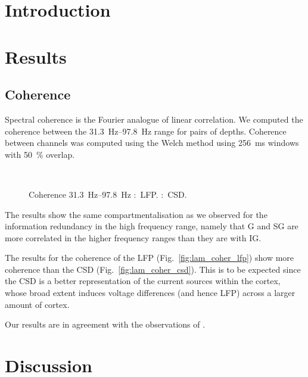 \section{Introduction}

\section{Results}

\subsection{Coherence}

Spectral coherence is the Fourier analogue of linear correlation.
We computed the coherence between the \SIrange{31.3}{97.8}{Hz} range for pairs of depths.
Coherence between channels was computed using the Welch method using \SI{256}{\milli\second} windows with \SI{50}{\percent} overlap.


\begin{figure}[htb]
    \centering
    ~~
    \caption{Coherence \SIrange{31.3}{97.8}{Hz}
\protect{}:~\ac{LFP}.
\protect{}:~\ac{CSD}.
}
\label{fig:lam_coher}
\end{figure}

The results show the same compartmentalisation as we observed for the information redundancy in the high frequency range, namely that \ac{G} and \ac{SG} are more correlated in the higher frequency ranges than they are with \ac{IG}.

The results for the coherence of the \ac{LFP} (Fig.~\ref{fig:lam_coher_lfp}) show more coherence than the \ac{CSD} (Fig.~\ref{fig:lam_coher_csd}).
This is to be expected since the \ac{CSD} is a better representation of the current sources within the cortex, whose broad extent induces voltage differences (and hence \ac{LFP}) across a larger amount of cortex.

Our results are in agreement with the observations of \citet[Figure 5B]{Maier2010}.


\section{Discussion}
